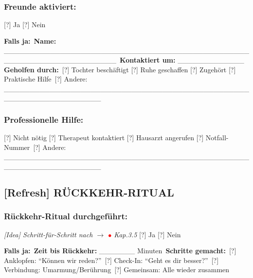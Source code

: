 \hypertarget{freunde-aktiviert}{%
\subsubsection{\texorpdfstring{\textbf{Freunde aktiviert:}}{Freunde aktiviert:}}\label{freunde-aktiviert}}

[?] Ja [?] Nein

\textbf{Falls ja:}\
\textbf{Name:} \_\_\_\_\_\_\_\_\_\_\_\_\_\_\_\_\_\_\_\_\_\_\_\_\_\_\_\_\_\_\_\_\_\_\_\_\_\_\_\_\_\_\_\_\_\_\_\_\_\_\_\_\_\_\_\_\_\_\_\_\_\_\_\_\_\_\_\_\_\_\
\textbf{Kontaktiert um:} \_\_\_\_\_\_\_\_\_\_\_\_\_ \textbf{Geholfen durch:}\
[?] Tochter beschäftigt [?] Ruhe geschaffen [?] Zugehört [?] Praktische Hilfe\
[?] Andere: \_\_\_\_\_\_\_\_\_\_\_\_\_\_\_\_\_\_\_\_\_\_\_\_\_\_\_\_\_\_\_\_\_\_\_\_\_\_\_\_\_\_\_\_\_\_\_\_\_\_\_\_\_\_\_\_\_\_\_\_\_\_\_\_\_\_\_

\hypertarget{professionelle-hilfe}{%
\subsubsection{\texorpdfstring{\textbf{Professionelle Hilfe:}}{Professionelle Hilfe:}}\label{professionelle-hilfe}}

[?] Nicht nötig [?] Therapeut kontaktiert [?] Hausarzt angerufen [?] Notfall-Nummer\
[?] Andere: \_\_\_\_\_\_\_\_\_\_\_\_\_\_\_\_\_\_\_\_\_\_\_\_\_\_\_\_\_\_\_\_\_\_\_\_\_\_\_\_\_\_\_\_\_\_\_\_\_\_\_\_\_\_\_\_\_\_\_\_\_\_\_\_\_\_\_

\hypertarget{ruxfcckkehr-ritual}{%
\subsection{\texorpdfstring{\textbf{[Refresh] RÜCKKEHR-RITUAL}}{[Refresh] RÜCKKEHR-RITUAL}}\label{ruxfcckkehr-ritual}}

\hypertarget{ruxfcckkehr-ritual-durchgefuxfchrt}{%
\subsubsection{\texorpdfstring{\textbf{Rückkehr-Ritual durchgeführt:}}{Rückkehr-Ritual durchgeführt:}}\label{ruxfcckkehr-ritual-durchgefuxfchrt}}

\emph{[Idea] Schritt-für-Schritt nach $\rightarrow$ \textcolor{red}{$\bullet$} Kap.3.5} [?] Ja [?] Nein

\textbf{Falls ja:}\
\textbf{Zeit bis Rückkehr:} \_\_\_\_\_\_\_ Minuten\
\textbf{Schritte gemacht:}\
[?] Anklopfen: ``Können wir reden?''\
[?] Check-In: ``Geht es dir besser?''\
[?] Verbindung: Umarmung/Berührung\
[?] Gemeinsam: Alle wieder zusammen

